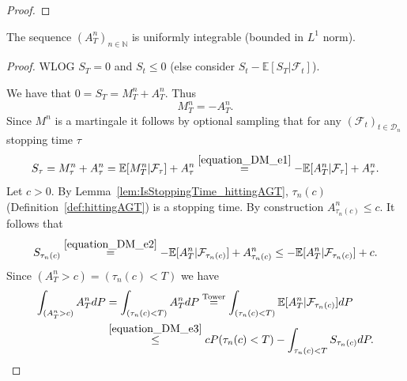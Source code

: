 \begin{proof}

\end{proof}


\begin{lemma}\label{lem:A_uniform_integrable}
  The sequence $(A^n_T)_{n\in\mathbb{N}}$ is uniformly integrable (bounded in $L^1$ norm).
\end{lemma}

\begin{proof}
  WLOG $S_T=0$ and $S_t\leq 0$ (else consider $S_t-\mathbb{E}\left[S_T\vert\mathcal{F}_{t}\right]$).

  We have that $0=S_T=M^n_T+A^n_T$. Thus
  \begin{equation}\label{equation_DM_e1}
  M^n_T=-A^n_T.
  \end{equation}
  Since $M^n$ is a martingale it follows by optional sampling that for any $(\mathcal{F}_t)_{t\in\mathcal{D}_n}$ stopping time $\tau$
  \begin{equation}\label{equation_DM_e2}
  S_\tau=M^n_\tau+A^n_\tau = \mathbb{E}[M^n_T\vert\mathcal{F}_\tau]+A^n_\tau\stackrel{\eqref{equation_DM_e1}}{=} -\mathbb{E}[A^n_T\vert\mathcal{F}_\tau]+A^n_\tau.
  \end{equation}
  Let $c>0$. By Lemma~\ref{lem:IsStoppingTime_hittingAGT}, $\tau_n(c)$ (Definition~\ref{def:hittingAGT}) is a stopping time.
  By construction $A^n_{\tau_n(c)}\leq c$. It follows that
  \begin{equation}\label{equation_DM_e3}
  S_{\tau_n(c)}\stackrel{\eqref{equation_DM_e2}}{=}-\mathbb{E}[A^n_T\vert\mathcal{F}_{\tau_n(c)}]+A^n_{\tau_n(c)}\leq -\mathbb{E}[A^n_T\vert\mathcal{F}_{\tau_n(c)}]+c.
  \end{equation}
  Since $(A^n_T>c)=(\tau_n(c)<T)$ we have
  \begin{align}\nonumber
  \int_{(A^n_T>c)}A^n_TdP&=\int_{(\tau_n(c)<T)}A^n_TdP\stackrel{\mathrm{Tower}}{=}\int_{(\tau_n(c)<T)}\mathbb{E}[A^n_T\vert\mathcal{F}_{\tau_n(c)}]dP\\
  &\stackrel{\eqref{equation_DM_e3}}{\leq} cP(\tau_n(c)<T)-\int_{\tau_n(c)<T}S_{\tau_n(c)}dP.\label{equation_DM_e4}

\end{align}
\end{proof}
